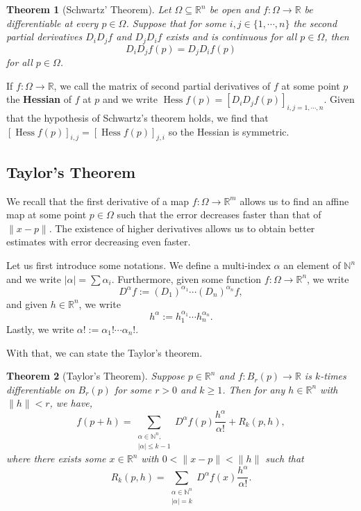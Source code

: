 \documentclass[
]{article}
\newtheorem{theorem}{Theorem}
\theoremstyle{definition}
\begin{document}
\begin{theorem}[Schwartz' Theorem]
  Let \(\Omega \subseteq \mathbb{R}^n\) be open and \(f : \Omega \to \mathbb{R}\) 
  be differentiable at every \(p \in \Omega\). Suppose that for some 
  \(i, j \in \{1, \cdots, n\}\) the second partial derivatives \(D_i D_j f\) and 
  \(D_j D_i f\) exists and is continuous for all \(p \in \Omega\), then 
  \[D_i D_j f(p) = D_j D_i f(p)\]
  for all \(p \in \Omega\).
\end{theorem}

If \(f : \Omega \to \mathbb{R}\), we call the matrix of second partial
derivatives of \(f\) at some point \(p\) the \textbf{Hessian} of \(f\)
at \(p\) and we write
\(\mathop{\mathrm{Hess}}f(p) = [D_i D_j f(p)]_{i, j = 1, \cdots, n}\).
Given that the hypothesis of Schwartz's theorem holds, we find that
\([\mathop{\mathrm{Hess}}f(p)]_{i, j} = [\mathop{\mathrm{Hess}}f(p)]_{j, i}\)
so the Hessian is symmetric.

\hypertarget{taylors-theorem}{%
\subsection{Taylor's Theorem}\label{taylors-theorem}}

We recall that the first derivative of a map
\(f : \Omega \to \mathbb{R}^m\) allows us to find an affine map at some
point \(p \in \Omega\) such that the error decreases faster than that of
\(\| x - p\|\). The existence of higher derivatives allows us to obtain
better estimates with error decreasing even faster.

Let us first introduce some notations. We define a multi-index
\(\alpha\) an element of \(\mathbb{N}^n\) and we write
\(\left| \alpha \right| = \sum \alpha_i\). Furthermore, given some
function \(f : \Omega \to \mathbb{R}^n\), we write
\[D^\alpha f := (D_1)^{\alpha_1}\cdots(D_n)^{\alpha_n} f,\] and given
\(h \in \mathbb{R}^n\), we write
\[h^\alpha := h_1 ^ {\alpha_1} \cdots h_n^{\alpha_n}.\] Lastly, we write
\(\alpha! := \alpha_1! \cdots \alpha_n!\).

With that, we can state the Taylor's theorem.

\begin{theorem}[Taylor's Theorem]
  Suppose \(p \in \mathbb{R}^n\) and \(f : B_r(p) \to \mathbb{R}\) is \(k\)-times
  differentiable on \(B_r(p)\) for some \(r > 0\) and \(k \ge 1\). Then for any 
  \(h \in \mathbb{R}^n\) with \(\|h\| < r\), we have,
  \[
    f(p + h) = \sum_{\substack{\alpha \in \mathbb{N}^n,\\ \left|\alpha\right| \le k - 1}} 
      D^\alpha f(p) \frac{h^\alpha}{\alpha!} + R_k(p, h),
  \]
  where there exists some \(x \in \mathbb{R}^n\) with \(0 < \| x - p\| < \| h \|\)
  such that 
  \[
    R_k(p, h) = \sum_{\substack{\alpha \in \mathbb{N}^n \\ \left| \alpha \right| = k}} 
      D^\alpha f(x)\frac{h^\alpha}{\alpha!}.
  \]
\end{theorem}
\proof
\end{document}
